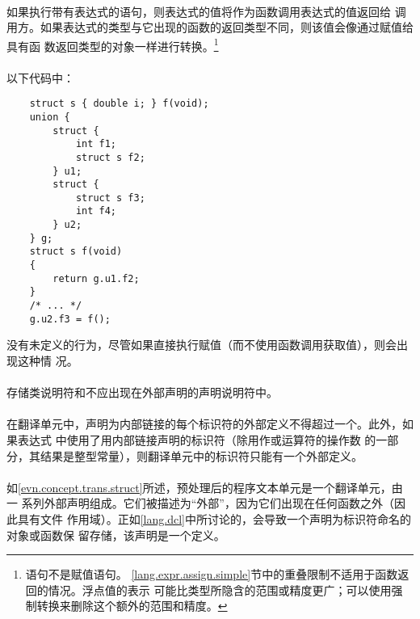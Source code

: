 \paragraph{}
如果执行带有表达式的语句，则表达式的值将作为函数调用表达式的值返回给
调用方。如果表达式的类型与它出现的函数的返回类型不同，则该值会像通过赋值给具有函
数返回类型的对象一样进行转换。\footnote{语句不是赋值语句。
\ref{lang.expr.assign.simple}节中的重叠限制不适用于函数返回的情况。浮点值的表示
可能比类型所隐含的范围或精度更广；可以使用强制转换来删除这个额外的范围和精度。}

\paragraph{}
\ex* 以下代码中：
\begin{lstlisting}
    struct s { double i; } f(void);
    union {
        struct {
            int f1;
            struct s f2;
        } u1;
        struct {
            struct s f3;
            int f4;
        } u2;
    } g;
    struct s f(void)
    {
        return g.u1.f2;
    }
    /* ... */
    g.u2.f3 = f();
\end{lstlisting}
没有未定义的行为，尽管如果直接执行赋值（而不使用函数调用获取值），则会出现这种情
况。

\syntax
\paragraph{}

\constraint
\paragraph{}
存储类说明符和不应出现在外部声明的声明说明符中。

\paragraph{}
在翻译单元中，声明为内部链接的每个标识符的外部定义不得超过一个。此外，如果表达式
中使用了用内部链接声明的标识符（除用作或运算符的操作数
的一部分，其结果是整型常量），则翻译单元中的标识符只能有一个外部定义。

\semantic
\paragraph{}
如\ref{evn.concept.trans.struct}所述，预处理后的程序文本单元是一个翻译单元，由一
系列外部声明组成。它们被描述为``外部''，因为它们出现在任何函数之外（因此具有文件
作用域）。正如\ref{lang.dcl}中所讨论的，会导致一个声明为标识符命名的对象或函数保
留存储，该声明是一个定义。

